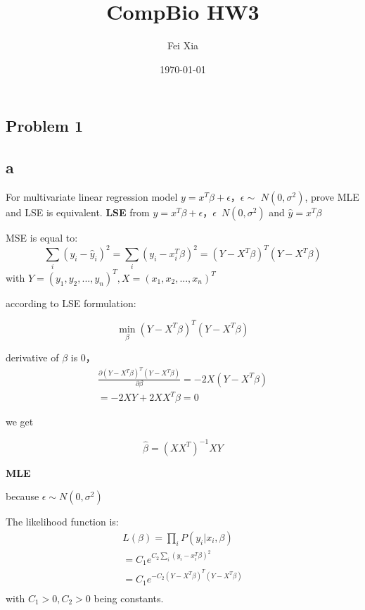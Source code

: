 \documentclass[a4paper]{article}
\author{Fei Xia}
\date{\today}
\title{CompBio HW3}
\begin{document}
\begin{CJK}{UTF8}{gbsn}
\maketitle

\section{Problem 1}
\subsection{a} %
For multivariate linear regression model $y=x^T\beta+\epsilon$，$\epsilon \sim $ $N(0,\sigma^2)$, prove MLE and LSE is equivalent.
{\bf LSE} %
from $y=x^T\beta+\epsilon$，$\epsilon$~$N(0,\sigma^2)$ and $\hat{y}=x^T\beta$

MSE is equal to: 
\begin{equation}
	\sum_i{(y_i-\hat{y}_i)^2}=\sum_i{(y_i-x_i^T\beta)^2}=(Y-X^T\beta)^T(Y-X^T\beta)
\end{equation}
with $Y=(y_1,y_2,...,y_n)^T,X=(x_1,x_2,...,x_n)^T$

according to LSE formulation:

\begin{equation}
    \min_{\beta}{(Y-X^T\beta)^T(Y-X^T\beta)}
\end{equation}

derivative of $\beta$ is $0$，
\begin{equation}
    \left.
    \begin{aligned}
        \frac{\partial (Y-X^T\beta)^T(Y-X^T\beta)}{\partial \beta} = -2X(Y-X^T\beta)\\
		=-2XY+2XX^T\beta=0
    \end{aligned}
    \right.
\end{equation}

we get 

\begin{equation}
    \hat{\beta}=(XX^T)^{-1}XY
\end{equation}

{\bf MLE} %


because $\epsilon \sim N(0,\sigma^2)$

The likelihood function is:
\begin{equation}
    \left.
    \begin{aligned}
        L(\beta)=\prod_i{P(y_i|x_i,\beta)}\\
		=C_1 e^{C_2\sum_i{(y_i-x_i^T\beta)^2}}\\
		=C_1 e^{-C_2 (Y-X^T\beta)^T(Y-X^T\beta)}\\
    \end{aligned}
    \right.
\end{equation}
with $C_1>0,C_2>0$ being constants.


\end{CJK}
\end{document}
